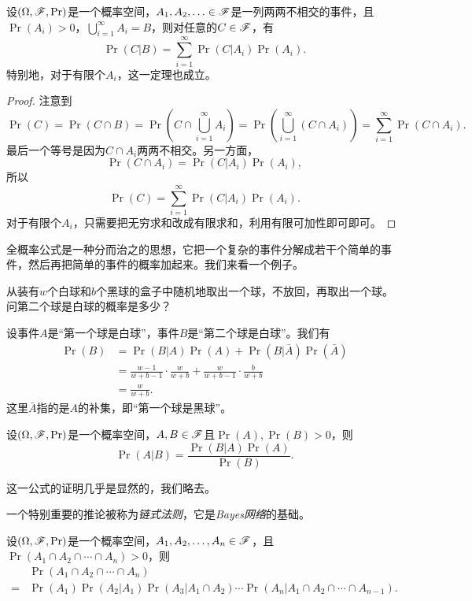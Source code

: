 \begin{theorem}[全概率公式]\label{thm:total-probability}
设$(\Omega,\mathscr{F},\Pr)$是一个概率空间，$A_1,A_2,\ldots\in\mathscr{F}$是一列两两不相交的事件，且$\Pr(A_i)>0$，$\bigcup_{i=1}^\infty A_i=B$，则对任意的$C\in\mathscr{F}$，有
\[
    \Pr(C|B) = \sum_{i=1}^\infty \Pr(C|A_i)\Pr(A_i).
\]
特别地，对于有限个$A_i$，这一定理也成立。
\end{theorem}
\begin{proof}
注意到
\[
    \Pr(C) = \Pr(C\cap B) = \Pr\left(C\cap\bigcup_{i=1}^\infty A_i\right) = \Pr\left(\bigcup_{i=1}^\infty (C\cap A_i)\right) = \sum_{i=1}^\infty \Pr(C\cap A_i).
\]
最后一个等号是因为$C\cap A_i$两两不相交。另一方面，
\[
    \Pr(C\cap A_i) = \Pr(C|A_i)\Pr(A_i),
\]
所以
\[
    \Pr(C) = \sum_{i=1}^\infty \Pr(C|A_i)\Pr(A_i).
\]
对于有限个$A_i$，只需要把无穷求和改成有限求和，利用有限可加性即可即可。
\end{proof}

全概率公式是一种分而治之的思想，它把一个复杂的事件分解成若干个简单的事件，然后再把简单的事件的概率加起来。我们来看一个例子。

\begin{example}
    从装有$w$个白球和$b$个黑球的盒子中随机地取出一个球，不放回，再取出一个球。问第二个球是白球的概率是多少？

    设事件$A$是“第一个球是白球”，事件$B$是“第二个球是白球”。我们有
\begin{align*}
    \Pr(B) &= \Pr(B|A)\Pr(A) + \Pr(B|\bar{A})\Pr(\bar{A}) \\
    &=\frac{w-1}{w+b-1}\cdot\frac{w}{w+b} + \frac{w}{w+b-1}\cdot\frac{b}{w+b}\\
    &=\frac{w}{w+b}.
\end{align*}
    这里$\bar A$指的是$A$的补集，即“第一个球是黑球”。
\end{example}

\begin{theorem}[贝叶斯公式]\label{thm:bayes}
设$(\Omega,\mathscr{F},\Pr)$是一个概率空间，$A,B\in\mathscr{F}$且$\Pr(A),\Pr(B)>0$，则
\[
    \Pr(A|B) = \frac{\Pr(B|A)\Pr(A)}{\Pr(B)}.
\]
\end{theorem}
这一公式的证明几乎是显然的，我们略去。

一个特别重要的推论被称为\emph{链式法则}，它是\emph{Bayes网络}的基础。

\begin{corollary}[链式法则]\label{cor:chain-rule}
设$(\Omega,\mathscr{F},\Pr)$是一个概率空间，$A_1,A_2,\ldots,A_n\in\mathscr{F}$，且$\Pr(A_1\cap A_2\cap\cdots\cap A_n)>0$，则
\begin{align*}
    &\Pr(A_1\cap A_2\cap\cdots\cap A_n)\\
    = &\Pr(A_1)\Pr(A_2|A_1)\Pr(A_3|A_1\cap A_2)\cdots\Pr(A_n|A_1\cap A_2\cap\cdots\cap A_{n-1}).
\end{align*}
\end{corollary}

